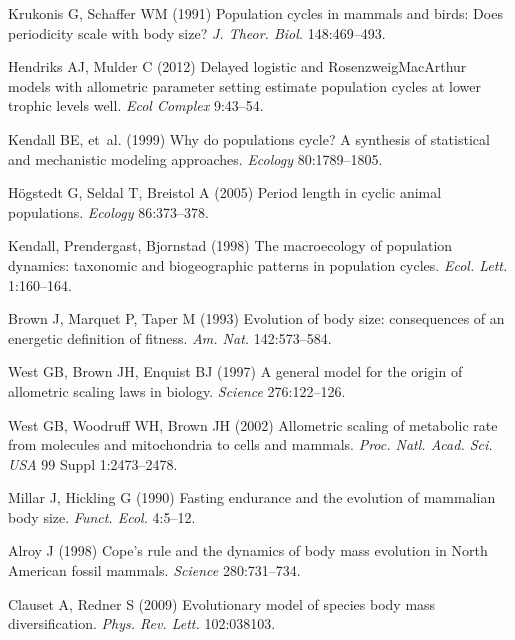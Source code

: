 \documentclass{pnastwo}
\begin{document}
\begin{article}
{\begin{thebibliography}{10}
Krukonis G, Schaffer WM
\newblock (1991) {Population cycles in mammals and birds: Does periodicity
  scale with body size?}
\newblock \emph{J. Theor. Biol.} 148:469--493.

Hendriks AJ, Mulder C
\newblock (2012) {Delayed logistic and Rosenzweig{\textendash}MacArthur models
  with allometric parameter setting estimate population cycles at lower trophic
  levels well}.
\newblock \emph{Ecol Complex} 9:43--54.

Kendall BE, {et~al.}
\newblock (1999) {Why do populations cycle? A synthesis of statistical and
  mechanistic modeling approaches}.
\newblock \emph{Ecology} 80:1789--1805.

H{\"o}gstedt G, Seldal T, Breistol A
\newblock (2005) {Period length in cyclic animal populations}.
\newblock \emph{Ecology} 86:373--378.

Kendall, Prendergast, Bjornstad
\newblock (1998) {The macroecology of population dynamics: taxonomic and
  biogeographic patterns in population cycles}.
\newblock \emph{Ecol. Lett.} 1:160--164.

Brown J, Marquet P, Taper M
\newblock (1993) {Evolution of body size: consequences of an energetic
  definition of fitness}.
\newblock \emph{Am. Nat.} 142:573--584.

West GB, Brown JH, Enquist BJ
\newblock (1997) {A general model for the origin of allometric scaling laws in
  biology}.
\newblock \emph{Science} 276:122--126.

West GB, Woodruff WH, Brown JH
\newblock (2002) {Allometric scaling of metabolic rate from molecules and
  mitochondria to cells and mammals.}
\newblock \emph{Proc. Natl. Acad. Sci. USA} 99 Suppl 1:2473--2478.

Millar J, Hickling G
\newblock (1990) {Fasting endurance and the evolution of mammalian body size}.
\newblock \emph{Funct. Ecol.} 4:5--12.

Alroy J
\newblock (1998) {Cope's rule and the dynamics of body mass evolution in North
  American fossil mammals}.
\newblock \emph{Science} 280:731--734.

Clauset A, Redner S
\newblock (2009) {Evolutionary model of species body mass diversification}.
\newblock \emph{Phys. Rev. Lett.} 102:038103.


\end{thebibliography}}
\end{article}
\end{document}
